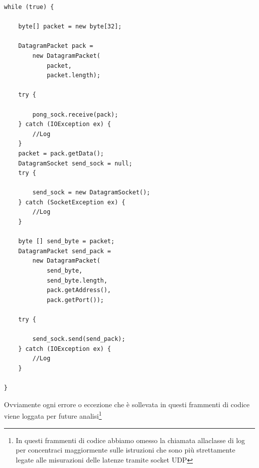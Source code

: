 \begin{lstlisting}
while (true) {

	byte[] packet = new byte[32];

	DatagramPacket pack = 
		new DatagramPacket(
			packet, 
			packet.length);

	try {

		pong_sock.receive(pack);
	} catch (IOException ex) {
		//Log
	}
	packet = pack.getData();
	DatagramSocket send_sock = null;
	try {

		send_sock = new DatagramSocket();
	} catch (SocketException ex) {
		//Log
	}

	byte [] send_byte = packet;
	DatagramPacket send_pack = 
		new DatagramPacket(
			send_byte,
			send_byte.length,
			pack.getAddress(),
			pack.getPort());

	try {

		send_sock.send(send_pack);
	} catch (IOException ex) {
		//Log
	}
	
}
\end{lstlisting}
Ovviamente ogni errore o eccezione che è sollevata in questi frammenti di codice viene loggata per future analisi\footnote{In questi frammenti di codice abbiamo omesso la chiamata allaclasse di log per concentraci maggiormente sulle istruzioni che sono più strettamente legate alle misurazioni delle latenze tramite socket UDP}

